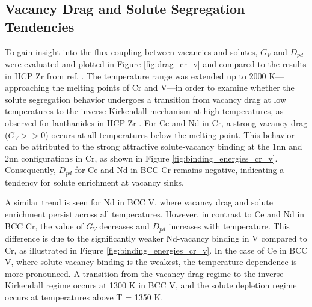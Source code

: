 \documentclass[preprint,12pt]{elsarticle}
\begin{document}
\FloatBarrier
\subsection{Vacancy Drag and Solute Segregation Tendencies}
\label{section_drag_cr_v}

To gain insight into the flux coupling between vacancies and solutes, $G_V$ and $D_{pd}$ were evaluated and plotted in Figure \ref{fig:drag_cr_v} and compared to the results in HCP Zr from ref. \cite{shousha2024first}.
The temperature range was extended up to 2000 K—approaching the melting points of Cr and V—in order to examine whether the solute segregation behavior undergoes a transition from vacancy drag at low temperatures to the inverse Kirkendall mechanism at high temperatures, as observed for lanthanides in HCP Zr \cite{shousha2024first}.
For Ce and Nd in Cr, a strong vacancy drag ($G_V >> 0$) occurs at all temperatures below the melting point. This behavior can be attributed to the strong attractive solute-vacancy binding at the 1nn and 2nn configurations in Cr, as shown in Figure \ref{fig:binding_energies_cr_v}. Consequently, $D_{pd}$ for Ce and Nd in BCC Cr remains negative, indicating a tendency for solute enrichment at vacancy sinks.

A similar trend is seen for Nd in BCC V, where vacancy drag and solute enrichment persist across all temperatures. However, in contrast to Ce and Nd in BCC Cr, the value of $G_V$ decreases and $D_{pd}$ increases with temperature. This difference is due to the significantly weaker Nd-vacancy binding in V compared to Cr, as illustrated in Figure \ref{fig:binding_energies_cr_v}. In the case of Ce in BCC V, where solute-vacancy binding is the weakest, the temperature dependence is more pronounced. A transition from the vacancy drag regime to the inverse Kirkendall regime occurs at 1300 K in BCC V, and the solute depletion regime occurs at temperatures above T = 1350 K.
\end{document}
